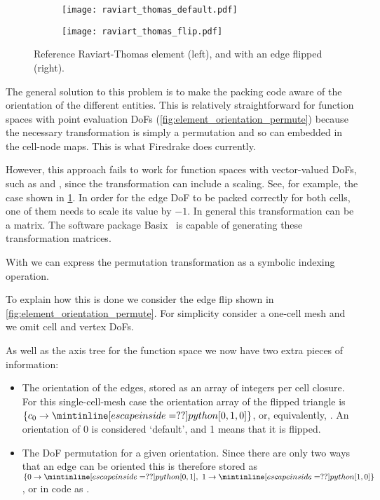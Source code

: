 \documentclass[thesis]{subfiles}
\begin{document}
\begin{figure}
  \centering
  \begin{subfigure}{0.45\textwidth}
    \centering
    \texttt{[image: raviart\_thomas\_default.pdf]}
  \end{subfigure}
  \begin{subfigure}{0.45\textwidth}
    \centering
    \texttt{[image: raviart\_thomas\_flip.pdf]}
  \end{subfigure}
  \caption{Reference Raviart-Thomas element (left), and with an edge flipped (right).}
  \label{fig:element_orientation_flip}
\end{figure}

The general solution to this problem is to make the packing code aware of the orientation of the different entities.
This is relatively straightforward for function spaces with point evaluation DoFs (\cref{fig:element_orientation_permute}) because the necessary transformation is simply a permutation and so can embedded in the cell-node maps.
This is what Firedrake does currently.

However, this approach fails to work for function spaces with vector-valued DoFs, such as \hdiv and \hcurl, since the transformation can include a scaling.
See, for example, the case shown in \cref{fig:element_orientation_flip}.
In order for the edge DoF to be packed correctly for both cells, one of them needs to scale its value by $-1$.
In general this transformation can be a matrix.
The software package Basix~\cite{scroggsBasixRuntimeFinite2022,scroggsConstructionArbitraryOrder2021} is capable of generating these transformation matrices.

With  we can express the permutation transformation as a symbolic indexing operation.

To explain how this is done we consider the edge flip shown in \cref{fig:element_orientation_permute}.
For simplicity consider a one-cell mesh and we omit cell and vertex DoFs.

As well as the axis tree for the function space we now have two extra pieces of information:

\begin{itemize}
  \item
    The orientation of the edges, stored as an array of integers per cell closure.
    For this single-cell-mesh case the orientation array of the flipped triangle is $\{ c_0 \to \pycode{[0, 1, 0]} \}$, or, equivalently, .
    An orientation of 0 is considered `default', and 1 means that it is flipped.

  \item
    The DoF permutation for a given orientation.
    Since there are only two ways that an edge can be oriented this is therefore stored as $\{ 0 \to \pycode{[0, 1]},\ 1 \to \pycode{[1, 0]} \}$, or in code as .
\end{itemize}
\end{document}
